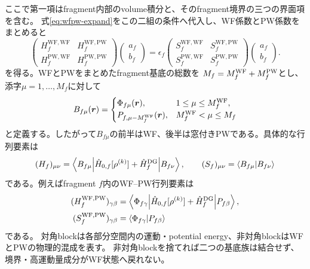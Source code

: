 \documentclass[11pt,a4paper]{article}
\begin{document}
ここで第一項はfragment内部のvolume積分と、そのfragment境界の三つの界面項を含む。
式\eqref{eq:wfpw-expand}をこの二組の条件へ代入し、WF係数とPW係数をまとめると
\begin{equation}
 \begin{pmatrix}
 H_f^{\mathrm{WF,WF}}&H_f^{\mathrm{WF,PW}}\\
 H_f^{\mathrm{PW,WF}}&H_f^{\mathrm{PW,PW}}
 \end{pmatrix}
 \begin{pmatrix}a_f\\b_f\end{pmatrix}
 =\epsilon_f
 \begin{pmatrix}
 S_f^{\mathrm{WF,WF}}&S_f^{\mathrm{WF,PW}}\\
 S_f^{\mathrm{PW,WF}}&S_f^{\mathrm{PW,PW}}
 \end{pmatrix}
 \begin{pmatrix}a_f\\b_f\end{pmatrix}.
 \label{eq:wfpw-block}
\end{equation}
を得る。WFとPWをまとめたfragment基底の総数を
$M_f=M_f^{\rm WF}+M_f^{\rm PW}$とし、添字$\mu=1,\ldots,M_f$に対して
\begin{equation*}
 B_{f\mu}(\boldsymbol r)=\begin{cases}
 \Phi_{f\mu}(\boldsymbol r),
 &1\leq\mu\leq M_f^{\rm WF},\\
 P_{f,\mu-M_f^{\rm WF}}(\boldsymbol r),
 &M_f^{\rm WF}<\mu\leq M_f
 \end{cases}
\end{equation*}
と定義する。したがって$B_{f\mu}$の前半はWF、後半は窓付きPWである。具体的な行列要素は
\begin{equation}
 (H_f)_{\mu\nu}
 =\left\langle B_{f\mu}\middle|\hat H_{0,f}[\rho^{(k)}]+\hat H_f^{\rm DG}
 \middle|B_{f\nu}\right\rangle,\qquad
 (S_f)_{\mu\nu}=\langle B_{f\mu}|B_{f\nu}\rangle
 \label{eq:wfpw-global-dg-block}
\end{equation}
である。例えばfragment $f$内のWF--PW行列要素は
\begin{align}
 (H_f^{\mathrm{WF,PW}})_{\gamma\beta}
 &=\left\langle\Phi_{f\gamma}\middle|\hat H_{0,f}[\rho^{(k)}]+\hat H_f^{\rm DG}
 \middle|P_{f\beta}\right\rangle,\\
 (S_f^{\mathrm{WF,PW}})_{\gamma\beta}
 &=\langle\Phi_{f\gamma}|P_{f\beta}\rangle
\end{align}
である。
対角blockは各部分空間内の運動・potential energy、非対角blockはWFとPWの物理的混成を表す。
非対角blockを捨てれば二つの基底族は結合せず、境界・高運動量成分がWF状態へ戻れない。
\end{document}
